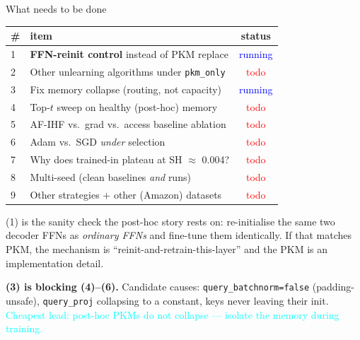 \documentclass{beamer}
\newcommand{\pierre}[1]{\textcolor{cyan}{#1}}
\newcommand{\strun}{\textcolor{blue}{running}}
\newcommand{\sttodo}{\textcolor{red}{todo}}
\begin{document}
\begin{frame}{What needs to be done}
\begin{center}
\begin{tabular}{|l|l|c|}
\hline
\# & item & status \\
\hline
1 & \textbf{FFN-reinit control} instead of PKM replace   & \strun \\
2 & Other unlearning algorithms under \texttt{pkm\_only} & \sttodo \\
3 & Fix memory collapse (routing, not capacity)          & \strun \\
4 & Top-$t$ sweep on healthy (post-hoc) memory           & \sttodo \\
5 & AF-IHF vs.\ grad vs.\ access baseline ablation       & \sttodo \\
6 & Adam vs.\ SGD \emph{under} selection                 & \sttodo \\
7 & Why does trained-in plateau at SH $\approx$ 0.004?   & \sttodo \\
8 & Multi-seed (clean baselines \emph{and} runs)         & \sttodo \\
9 & Other strategies $+$ other (Amazon) datasets         & \sttodo \\
\hline
\end{tabular}
\end{center}

\medskip
\alert{(1) is the sanity check the post-hoc story rests on:} re-initialise the
same two decoder FFNs as \emph{ordinary FFNs} and fine-tune them identically.
If that matches PKM, the mechanism is ``reinit-and-retrain-this-layer'' and the
PKM is an implementation detail.

\medskip
\textbf{(3) is blocking (4)--(6).} Candidate causes:
\texttt{query\_batchnorm=false} (padding-unsafe), \texttt{query\_proj} collapsing
to a constant, keys never leaving their init.
\pierre{Cheapest lead: post-hoc PKMs do not collapse --- isolate the memory
during training.}
\end{frame}
\end{document}
